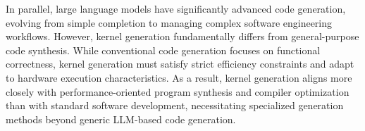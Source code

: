 In parallel, large language models have significantly advanced code generation, evolving from simple completion to managing complex software engineering workflows. However, kernel generation fundamentally differs from general-purpose code synthesis. While conventional code generation focuses on functional correctness, kernel generation must satisfy strict efficiency constraints and adapt to hardware execution characteristics. As a result, kernel generation aligns more closely with performance-oriented program synthesis and compiler optimization than with standard software development, necessitating specialized generation methods beyond generic LLM-based code generation.




